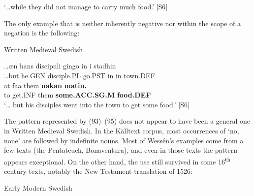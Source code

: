 \glt  ‘…while they did not manage to carry much food.’ [S6]

\z

The only example that is neither inherently negative nor within the scope of a negation is the following:


\item 

\label{bkm:Ref78603365}Written Medieval Swedish



 \ea\label{}
\gll …æn  hans  discipuli  gingo  in  i  stadhin\\


…but  he.GEN  disciple.PL  go.PST  in  in  town.DEF\\

 \ea\label{}
\gll at  faa  them  \textbf{nakan} \textbf{matin.}\\


to  get.INF  them  \textbf{some.ACC.SG.M} \textbf{food.DEF}\\

\glt ‘… but his disciples went into the town to get some food.’ [S6]

\z

The pattern represented by (93)–(95) does not appear to have been a general one in Written Medieval Swedish. In the Källtext corpus, most occurrences of  ‘no, none’ are followed by indefinite nouns. Most of Wessén’s examples come from a few texts (the Pentateuch, Bonaventura), and even in those texts the pattern appears exceptional. On the other hand, the use still survived in some 16\textsuperscript{th} century texts, notably the New Testament translation of 1526:


\item 

Early Modern Swedish

